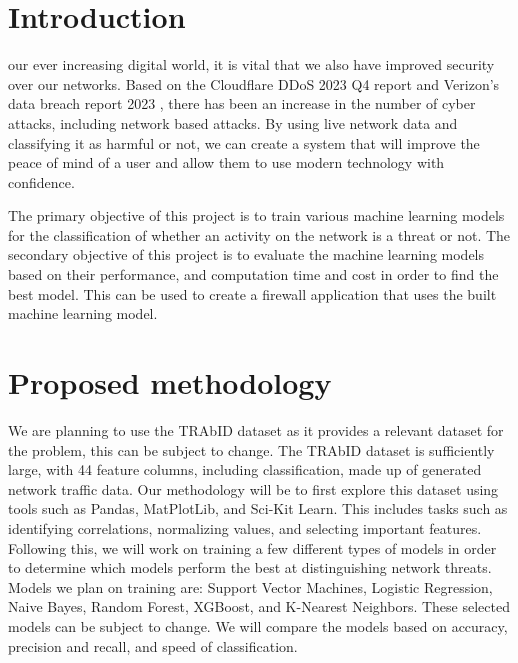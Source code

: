 \IEEEpeerreviewmaketitle

\section{Introduction}

 our ever increasing digital world, it is vital that we also have improved security over our networks. Based on the Cloudflare DDoS 2023 Q4 report \cite{cloudflare} and Verizon’s data breach report 2023 \cite{verizion}, there has been an increase in the number of cyber attacks, including network based attacks. By using live network data and classifying it as harmful or not, we can create a system that will improve the peace of mind of a user and allow them to use modern technology with confidence.

The primary objective of this project is to train various machine learning models for the classification of whether an activity on the network is a threat or not. The secondary objective of this project is to evaluate the machine learning models based on their performance, and computation time and cost in order to find the best model. This can be used to create a firewall application \cite{ucar2017analysis} that uses the built machine learning model.

\section{Proposed methodology}
We are planning to use the TRAbID dataset \cite{viegas2017toward} as it provides a relevant dataset for the problem, this can be subject to change. The TRAbID dataset is sufficiently large, with 44 feature columns, including classification, made up of generated network traffic data. Our methodology will be to first explore this dataset using tools such as Pandas, MatPlotLib, and Sci-Kit Learn. This includes tasks such as identifying correlations, normalizing values, and selecting important features. Following this, we will work on training a few different types of models in order to determine which models perform the best at distinguishing network threats. Models we plan on training are: Support Vector Machines, Logistic Regression, Naive Bayes, Random Forest, XGBoost, and K-Nearest Neighbors. These selected models can be subject to change. We will compare the models based on accuracy, precision and recall, and speed of classification.

